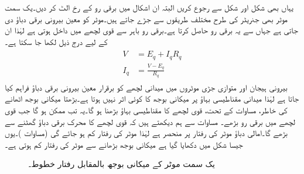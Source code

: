 یہاں بھی شکل   اور شکل   سے رجوع کریں البتہ ان اشکال میں برقی رو کے رخ الٹ کر دیں۔یک سمت  موٹر بھی جنریٹر کی طرح مختلف طریقوں سے جڑے جاتے ہیں۔موٹر کو معین بیرونی برقی دباؤ دی جاتی ہے جہاں سے یہ برقی رو حاصل کرتا ہے۔برقی رو باہر سے قوی لچھے میں داخل ہوتی ہے لہٰذا ان کے لیے درج ذیل لکھا جا سکتا ہے۔
\begin{gather}
\begin{aligned}\label{مساوات_یکسمتی_دباو_رو_قوی_سلسلہ_وار}
V&=E_q+I_q R_q\\
I_q&=\frac{V-E_q}{R_q}
\end{aligned}
\end{gather}
بیرونی ہیجان اور متوازی جڑی موٹروں میں میدانی لچھے کو برقرار معین بیرونی برقی دباؤ فراہم کیا جاتا ہے لہٰذا میدانی مقناطیسی بہاؤ پر میکانی بوجھ کا کوئی اثر نہیں ہوتا ہے۔بڑھتا میکانی بوجھ اٹھانے کی خاطر، مساوات    کے تحت، قوی لچھے کا مقناطیسی بہاؤ بڑھنا ہو گا۔یہ تب ممکن ہو گا جب قوی لچھے میں برقی رو بڑھے۔ مساوات   سے ہم دیکھتے ہیں کہ قوی لچھے کا محرک برقی دباؤ   گھٹنے سے   بڑھے گا۔امالی دباؤ  موٹر کی رفتار پر منحصر ہے   لہٰذا موٹر کی رفتار کم ہو جائے گی (مساوات )۔یوں جیسا  شکل    میں  دکھایا گیا ہے میکانی بوجھ بڑھانے سے موٹر کی رفتار کم ہوتی ہے۔
\begin{figure}
\centering
\newcommand\DrawControl[3]{
  node[#2,circle,fill=#2,inner sep=2pt,label={above:$#1$},label={[black]below:{\footnotesize#3}}] at #1 {}
}
%
\caption{یک سمت  موٹر کے میکانی بوجھ بالمقابل رفتار خطوط۔}
\label{شکل_یکسمتی_موٹر_رفتار_بالمقابل_بار}
\end{figure}

